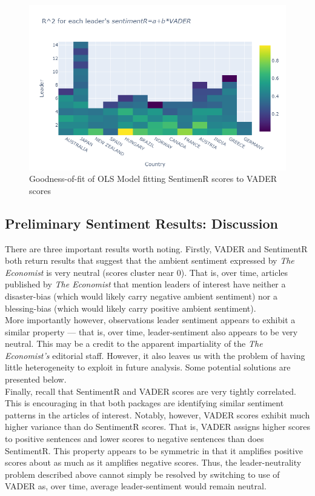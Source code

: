 \documentclass[11pt, letterpaper, twoside]{article}
\begin{document}
\begin{figure}
    \caption{Goodness-of-fit of OLS Model fitting SentimenR scores to VADER scores}
    \centering
    \includegraphics[clip, width=\textwidth]{figures/plotly_VADER_SENTIMENTR_rsquared_heatmap.png}
\end{figure}

\subsection{Preliminary Sentiment Results: Discussion}
There are three  important results worth noting. Firstly, VADER and SentimentR both return results that suggest that the ambient sentiment expressed by \textit{The Economist} is very neutral (scores cluster near 0). That is, over time, articles published by \textit{The Economist} that mention leaders of interest have neither a disaster-bias (which would likely carry negative ambient sentiment) nor a blessing-bias (which would likely carry positive ambient sentiment).\\



More importantly however, observations leader sentiment appears to exhibit a similar property --- that is, over time, leader-sentiment also appears to be very neutral. This may be a credit to the apparent impartiality of the \textit{The Economist's} editorial staff. However, it also leaves us with the problem of having little heterogeneity to exploit in future analysis. Some potential solutions are presented below.\\

Finally, recall that SentimentR and VADER scores are very tightly correlated. This is encouraging in that both packages are identifying similar sentiment patterns in the articles of interest. Notably, however, VADER scores exhibit much higher variance than do SentimentR scores. That is, VADER assigns higher scores to positive sentences and lower scores to negative sentences than does SentimentR. This property appears to be symmetric in that it amplifies positive scores about as much as it amplifies negative scores. Thus, the leader-neutrality problem described above cannot simply be resolved by switching to use of VADER as, over time, average leader-sentiment would remain neutral.
\end{document}
